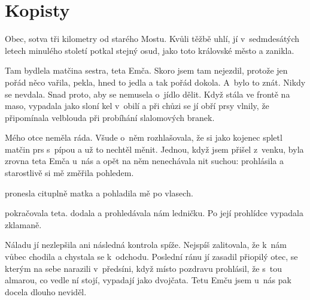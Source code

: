 
\chapter{Kopisty}

Obec, sotva tři kilometry od starého Mostu. Kvůli těžbě uhlí, jí v~sedmdesátých
letech minulého století potkal stejný osud, jako toto královské město a
zanikla.

Tam bydlela matčina sestra, teta Emča. Skoro jsem tam nejezdil, protože jen
pořád něco vařila, pekla, hned to jedla a tak pořád dokola. A~bylo to znát.
Nikdy se nevdala. Snad proto, aby se nemusela o~jídlo dělit. Když stála ve
frontě na maso, vypadala jako sloní kel v~obilí a při chůzi se jí obří prsy
vlnily, že připomínala velblouda při probíhání slalomových branek.

Mého otce neměla ráda. Všude o~něm rozhlašovala, že si jako kojenec spletl
matčin prs s~pípou a už to nechtěl měnit. Jednou, když jsem přišel z~venku,
byla zrovna teta Emča u~nás a opět na něm nenechávala nit suchou:  prohlásila a starostlivě si mě změřila pohledem. 

 pronesla cituplně matka a
pohladila mě po vlasech.

 pokračovala teta.
 dodala a prohledávala nám ledničku. Po její prohlídce
vypadala zklamaně.

Náladu jí nezlepšila ani následná kontrola spíže. Nejspíš zalitovala, že k~nám
vůbec chodila a chystala se k~odchodu. Poslední ránu jí zasadil přiopilý otec,
se kterým na sebe narazili v~předsíni, když místo pozdravu prohlásil, že s~tou
almarou, co vedle ní stojí, vypadají jako dvojčata. Tetu Emču jsem u~nás pak
docela dlouho neviděl.

